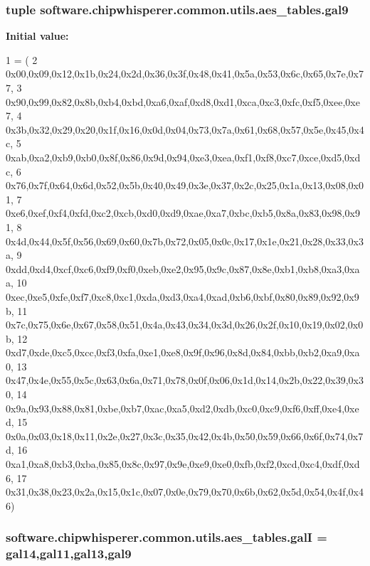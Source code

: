 \subsubsection[{gal9}]{\setlength{\rightskip}{0pt plus 5cm}tuple software.\+chipwhisperer.\+common.\+utils.\+aes\+\_\+tables.\+gal9}\label{namespacesoftware_1_1chipwhisperer_1_1common_1_1utils_1_1aes__tables_acd6562231fb0f517aa9ccf026745606a}
{\bfseries Initial value\+:}
\begin{DoxyCode}
1 = (
2 0x00,0x09,0x12,0x1b,0x24,0x2d,0x36,0x3f,0x48,0x41,0x5a,0x53,0x6c,0x65,0x7e,0x77,
3 0x90,0x99,0x82,0x8b,0xb4,0xbd,0xa6,0xaf,0xd8,0xd1,0xca,0xc3,0xfc,0xf5,0xee,0xe7,
4 0x3b,0x32,0x29,0x20,0x1f,0x16,0x0d,0x04,0x73,0x7a,0x61,0x68,0x57,0x5e,0x45,0x4c,
5 0xab,0xa2,0xb9,0xb0,0x8f,0x86,0x9d,0x94,0xe3,0xea,0xf1,0xf8,0xc7,0xce,0xd5,0xdc,
6 0x76,0x7f,0x64,0x6d,0x52,0x5b,0x40,0x49,0x3e,0x37,0x2c,0x25,0x1a,0x13,0x08,0x01,
7 0xe6,0xef,0xf4,0xfd,0xc2,0xcb,0xd0,0xd9,0xae,0xa7,0xbc,0xb5,0x8a,0x83,0x98,0x91,
8 0x4d,0x44,0x5f,0x56,0x69,0x60,0x7b,0x72,0x05,0x0c,0x17,0x1e,0x21,0x28,0x33,0x3a,
9 0xdd,0xd4,0xcf,0xc6,0xf9,0xf0,0xeb,0xe2,0x95,0x9c,0x87,0x8e,0xb1,0xb8,0xa3,0xaa,
10 0xec,0xe5,0xfe,0xf7,0xc8,0xc1,0xda,0xd3,0xa4,0xad,0xb6,0xbf,0x80,0x89,0x92,0x9b,
11 0x7c,0x75,0x6e,0x67,0x58,0x51,0x4a,0x43,0x34,0x3d,0x26,0x2f,0x10,0x19,0x02,0x0b,
12 0xd7,0xde,0xc5,0xcc,0xf3,0xfa,0xe1,0xe8,0x9f,0x96,0x8d,0x84,0xbb,0xb2,0xa9,0xa0,
13 0x47,0x4e,0x55,0x5c,0x63,0x6a,0x71,0x78,0x0f,0x06,0x1d,0x14,0x2b,0x22,0x39,0x30,
14 0x9a,0x93,0x88,0x81,0xbe,0xb7,0xac,0xa5,0xd2,0xdb,0xc0,0xc9,0xf6,0xff,0xe4,0xed,
15 0x0a,0x03,0x18,0x11,0x2e,0x27,0x3c,0x35,0x42,0x4b,0x50,0x59,0x66,0x6f,0x74,0x7d,
16 0xa1,0xa8,0xb3,0xba,0x85,0x8c,0x97,0x9e,0xe9,0xe0,0xfb,0xf2,0xcd,0xc4,0xdf,0xd6,
17 0x31,0x38,0x23,0x2a,0x15,0x1c,0x07,0x0e,0x79,0x70,0x6b,0x62,0x5d,0x54,0x4f,0x46)
\end{DoxyCode}
\hypertarget{namespacesoftware_1_1chipwhisperer_1_1common_1_1utils_1_1aes__tables_a8c6e59ff45f12a20bde33e231d839ee3}{}
\subsubsection[{gal\+I}]{\setlength{\rightskip}{0pt plus 5cm}software.\+chipwhisperer.\+common.\+utils.\+aes\+\_\+tables.\+gal\+I = {\bf gal14},{\bf gal11},{\bf gal13},{\bf gal9}}\label{namespacesoftware_1_1chipwhisperer_1_1common_1_1utils_1_1aes__tables_a8c6e59ff45f12a20bde33e231d839ee3}
\hypertarget{namespacesoftware_1_1chipwhisperer_1_1common_1_1utils_1_1aes__tables_a1bebe9800fe6dfd3fc4c35d310db0539}{}
